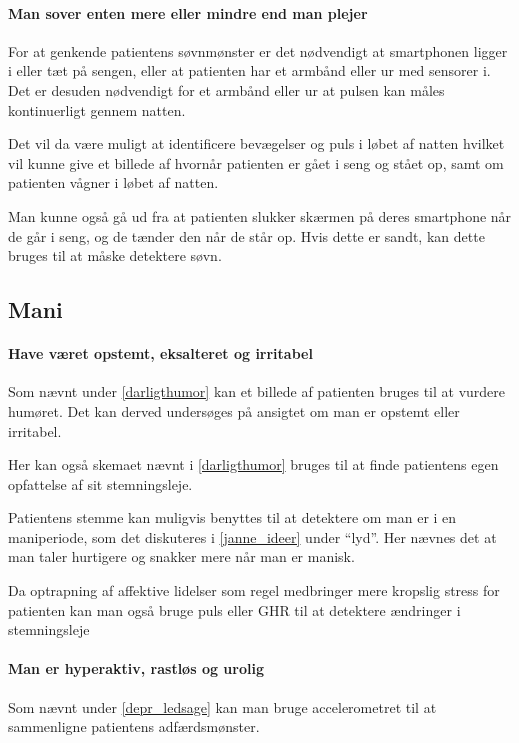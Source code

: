 \paragraph{Man sover enten mere eller mindre end man plejer}
For at genkende patientens søvnmønster er det nødvendigt at smartphonen ligger i eller tæt på sengen, eller at patienten har et armbånd eller ur med sensorer i.
Det er desuden nødvendigt for et armbånd eller ur at pulsen kan måles kontinuerligt gennem natten.

Det vil da være muligt at identificere bevægelser og puls i løbet af natten hvilket vil kunne give et billede af hvornår patienten er gået i seng og stået op, samt om patienten vågner i løbet af natten.

Man kunne også gå ud fra at patienten slukker skærmen på deres smartphone når de går i seng, og de tænder den når de står op. Hvis dette er sandt, kan dette bruges til at måske detektere søvn.

\subsection{Mani}

\paragraph{Have været opstemt, eksalteret og irritabel}
Som nævnt under \cref{darligthumor} kan et billede af patienten bruges til at vurdere humøret. 
Det kan derved undersøges på ansigtet om man er opstemt eller irritabel.

Her kan også skemaet nævnt i \cref{darligthumor} bruges til at finde patientens egen opfattelse af sit stemningsleje.

Patientens stemme kan muligvis benyttes til at detektere om man er i en maniperiode, som det diskuteres i \cref{janne_ideer} under ``lyd''. 
Her nævnes det at man taler hurtigere og snakker mere når man er manisk.

Da optrapning af affektive lidelser som regel medbringer mere kropslig stress for patienten kan man også bruge puls eller GHR til at detektere ændringer i stemningsleje \citep{misc:jorgen-aagaard}

\paragraph{Man er hyperaktiv, rastløs og urolig}
Som nævnt under \cref{depr_ledsage} kan man bruge accelerometret til at sammenligne patientens adfærdsmønster.

